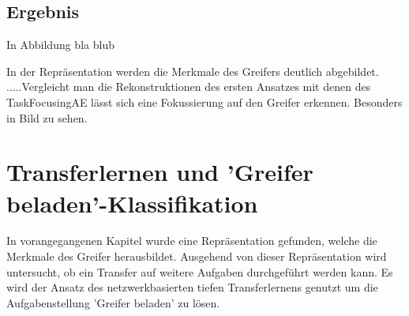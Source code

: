 	\subsection{Ergebnis}
	
	In Abbildung  bla blub
	
	In der Repräsentation werden die Merkmale des Greifers deutlich abgebildet. .....Vergleicht man die Rekonstruktionen des ersten Ansatzes mit denen des TaskFocusingAE lässt sich eine Fokussierung auf den Greifer erkennen. Besonders in Bild zu sehen.
	
	
	
	\section{Transferlernen und 'Greifer beladen'-Klassifikation}
	\label{sec:TransferLearningGrappleLoaded}
	In vorangegangenen Kapitel wurde eine Repräsentation gefunden, welche die Merkmale des Greifer herausbildet. Ausgehend von dieser Repräsentation wird untersucht, ob ein Transfer auf weitere Aufgaben durchgeführt werden kann. Es wird der Ansatz des netzwerkbasierten tiefen Transferlernens genutzt um die Aufgabenstellung 'Greifer beladen' zu lösen.
